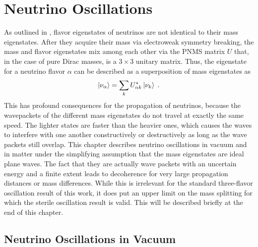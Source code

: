 \setchapterpreamble[u]{\margintoc}
\chapter{Neutrino Oscillations}

As outlined in , flavor eigenstates of neutrinos are not identical to their mass eigenstates. After they acquire their mass via electroweak symmetry breaking, the mass and flavor eigenstates mix among each other via the PNMS matrix $U$ that, in the case of pure Dirac masses, is a $3\times3$ unitary matrix. Thus, the eigenstate for a neutrino flavor $\alpha$ can be described as a superposition of mass eigenstates as
\begin{equation}
    \ket{\nu_\alpha} = \sum_k U^*_{\alpha k}\ket{\nu_k}\;.\label{eq:flavor-state-def}
\end{equation}
This has profound consequences for the propagation of neutrinos, because the wavepackets of the different mass eigenstates do not travel at exactly the same speed. The lighter states are faster than the heavier ones, which causes the waves to interfere with one another constructively or destructively as long as the wave packets still overlap. This chapter describes neutrino oscillations in vacuum and in matter under the simplifying assumption that the mass eigenstates are ideal plane waves. The fact that they are actually wave packets with an uncertain energy and a finite extent leads to decoherence for very large propagation distances or mass differences. While this is irrelevant for the standard three-flavor oscillation result of this work, it does put an upper limit on the mass splitting for which the sterile oscillation result is valid. This will be described briefly at the end of this chapter.

\section{Neutrino Oscillations in Vacuum}

